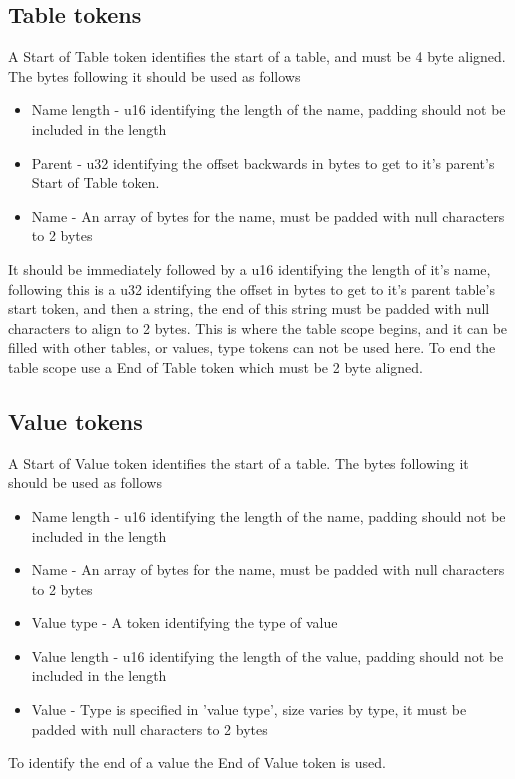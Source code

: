 \documentclass{article}
\begin{document}
\subsection{Table tokens}
A Start of Table token identifies the start of a table, and must be 4 byte aligned. 
The bytes following it should be used as follows
\begin{itemize}
    \item Name length - u16 identifying the length of the name, padding should not be included in the length
    \item Parent - u32 identifying the offset backwards in bytes to get to it's parent's Start of Table token.
    \item Name - An array of bytes for the name, must be padded with null characters to 2 bytes
\end{itemize}
It should be immediately followed by a u16 identifying the length of it's name, following this is a u32 identifying the offset in bytes to get to it's parent table's start token, and then a string, the end of this string must be padded with null characters to align to 2 bytes.
This is where the table scope begins, and it can be filled with other tables, or values, type tokens can not be used here.
To end the table scope use a End of Table token which must be 2 byte aligned.

\subsection{Value tokens}
A Start of Value token identifies the start of a table.
The bytes following it should be used as follows
\begin{itemize}
    \item Name length - u16 identifying the length of the name, padding should not be included in the length
    \item Name - An array of bytes for the name, must be padded with null characters to 2 bytes
    \item Value type - A token identifying the type of value
    \item Value length - u16 identifying the length of the value, padding should not be included in the length
    \item Value - Type is specified in 'value type', size varies by type, it must be padded with null characters to 2 bytes
\end{itemize}
To identify the end of a value the End of Value token is used.
\end{document}

